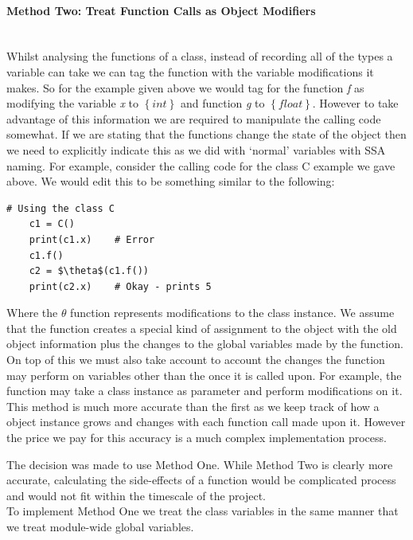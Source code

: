 \documentclass[12pt, titlepage]{article}
\begin{document}
\paragraph{Method Two: Treat Function Calls as Object Modifiers}\mbox{}\\
Whilst analysing the functions of a class, instead of recording all of the types a variable can take we can tag the function with the variable modifications it makes. So for the example given above we would tag for the function \textit{f} as modifying the variable \textit{x} to $\left\{ {int}\right\}$ and function \textit{g} to $\left\{ {float}\right\}$. However to take advantage of this information we are required to manipulate the calling code somewhat. If we are stating that the functions change the state of the object then we need to explicitly indicate this as we did with `normal' variables with SSA naming. For example, consider the calling code for the class C example we gave above. We would edit this to be something similar to the following:
\begin{lstlisting}[mathescape]
    # Using the class C
    c1 = C()
    print(c1.x)    # Error
    c1.f()
    c2 = $\theta$(c1.f())
    print(c2.x)    # Okay - prints 5
\end{lstlisting}
Where the $\theta$ function represents modifications to the class instance. We assume that the function creates a special kind of assignment to the object with the old object information plus the changes to the global variables made by the function. On top of this we must also take account to account the changes the function may perform on variables other than the once it is called upon. For example, the function may take a class instance as parameter and perform modifications on it. \\
This method is much more accurate than the first as we keep track of how a object instance grows and changes with each function call made upon it. However the price we pay for this accuracy is a much complex implementation process.

The decision was made to use Method One. While Method Two is clearly more accurate, calculating the side-effects of a function would be complicated process and would not fit within the timescale of the project. \\
To implement Method One we treat the class variables in the same manner that we treat module-wide global variables.
\end{document}
